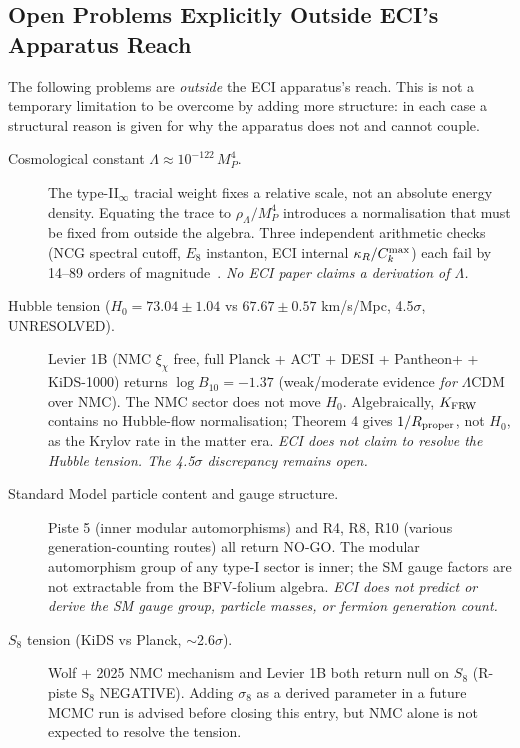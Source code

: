 \subsection{Open Problems Explicitly Outside ECI's Apparatus Reach}
\label{subsec:outside}

The following problems are \emph{outside} the ECI apparatus's reach.
This is not a temporary limitation to be overcome by adding more structure:
in each case a structural reason is given for why the apparatus does not
and cannot couple.

\begin{description}

\item[Cosmological constant $\Lambda \approx 10^{-122}\,M_P^4$.]
  The type-II$_\infty$ tracial weight fixes a relative scale, not an absolute
  energy density.  Equating the trace to $\rho_\Lambda / M_P^4$ introduces a
  normalisation that must be fixed from outside the algebra.
  Three independent arithmetic checks (NCG spectral cutoff, $E_8$ instanton,
  ECI internal $\kappa_R / C_k^{\rm max}$) each fail by 14--89 orders of
  magnitude~\cite{ECI_cosmo_const_audit}.
  \emph{No ECI paper claims a derivation of $\Lambda$.}

\item[Hubble tension ($H_0 = 73.04 \pm 1.04$ vs $67.67 \pm 0.57$
  km/s/Mpc, 4.5$\sigma$, UNRESOLVED).]
  Levier 1B (NMC $\xi_\chi$ free, full Planck + ACT + DESI + Pantheon+
  + KiDS-1000) returns $\log B_{10} = -1.37$ (weak/moderate evidence
  \emph{for} $\Lambda$CDM over NMC).  The NMC sector does not move $H_0$.
  Algebraically, $K_{\rm FRW}$ contains no Hubble-flow normalisation;
  Theorem 4 gives $1/R_{\rm proper}$, not $H_0$, as the Krylov rate in the
  matter era.
  \emph{ECI does not claim to resolve the Hubble tension.
  The 4.5$\sigma$ discrepancy remains open.}

\item[Standard Model particle content and gauge structure.]
  Piste 5 (inner modular automorphisms) and R4, R8, R10 (various
  generation-counting routes) all return NO-GO.  The modular automorphism
  group of any type-I sector is inner; the SM gauge factors are not
  extractable from the BFV-folium algebra.
  \emph{ECI does not predict or derive the SM gauge group, particle masses,
  or fermion generation count.}

\item[$S_8$ tension (KiDS vs Planck, $\sim$2.6$\sigma$).]
  Wolf + 2025 NMC mechanism and Levier 1B both return null on $S_8$
  (R-piste S$_8$ NEGATIVE).  Adding $\sigma_8$ as a derived parameter in
  a future MCMC run is advised before closing this entry, but NMC alone
  is not expected to resolve the tension.


\end{description}
